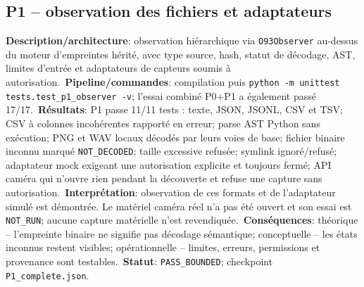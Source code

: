 \documentclass[11pt,a4paper,oneside]{report}
\begin{document}
\subsection{P1 -- observation des fichiers et adaptateurs}
\textbf{Description/architecture}: observation hiérarchique via \texttt{O93Observer} au-dessus du moteur d'empreintes hérité, avec type source, hash, statut de décodage, AST, limites d'entrée et adaptateurs de capteurs soumis à autorisation.\
\textbf{Pipeline/commandes}: compilation puis \texttt{python -m unittest tests.test\_p1\_observer -v}; l'essai combiné P0+P1 a également passé 17/17.\
\textbf{Résultats}: P1 passe 11/11 tests : texte, JSON, JSONL, CSV et TSV; CSV à colonnes incohérentes rapporté en erreur; parse AST Python sans exécution; PNG et WAV locaux décodés par leurs voies de base; fichier binaire inconnu marqué \texttt{NOT\_DECODED}; taille excessive refusée; symlink ignoré/refusé; adaptateur mock exigeant une autorisation explicite et toujours fermé; API caméra qui n'ouvre rien pendant la découverte et refuse une capture sans autorisation.\
\textbf{Interprétation}: observation de ces formats et de l'adaptateur simulé est démontrée. Le matériel caméra réel n'a pas été ouvert et son essai est \texttt{NOT\_RUN}; aucune capture matérielle n'est revendiquée.\
\textbf{Conséquences}: théorique -- l'empreinte binaire ne signifie pas décodage sémantique; conceptuelle -- les états inconnus restent visibles; opérationnelle -- limites, erreurs, permissions et provenance sont testables.\
\textbf{Statut}: \texttt{PASS\_BOUNDED}; checkpoint \texttt{P1\_complete.json}.\
\end{document}
